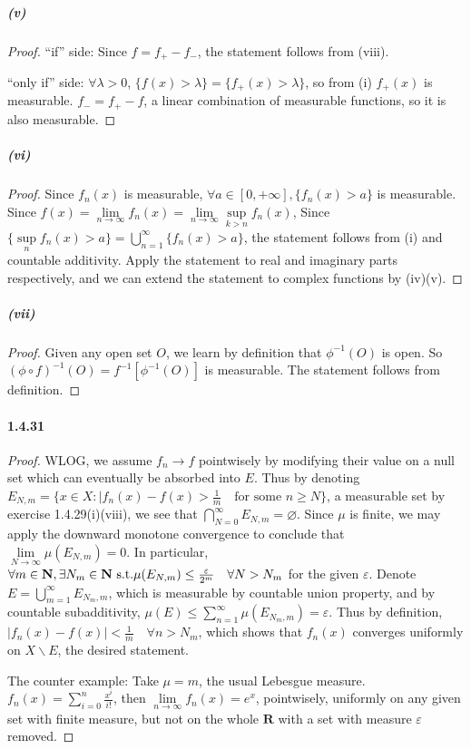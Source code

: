 \documentclass{article}
\begin{document}
\subparagraph{(v)}
\begin{proof}
``if'' side:  Since $f=f_+-f_-$, the statement follows from (viii).

``only if'' side: $\forall \lambda>0$, $\{f(x)>\lambda\}=\{f_+(x)>\lambda\}$, so from (i) $f_+(x)$ is measurable. $f_-=f_+-f$, a linear combination of measurable functions, so it is also measurable. 
\end{proof}

\subparagraph{(vi)}
\begin{proof}
Since $f_n(x)$ is measurable, $\forall a\in[0,+\infty],\{f_n(x)>a\}$ is measurable. Since $f(x)=\lim\limits_{n\to\infty}f_n(x)=\lim\limits_{n\to\infty}\sup\limits_{k>n}f_n(x)$, Since $\{\sup\limits_{n}f_n(x)>a\}=\bigcup\limits_{n=1}^{\infty}\{f_n(x)>a\}$, the statement follows from (i) and countable additivity. Apply the statement to real and imaginary parts respectively, and we can extend the statement to complex functions by (iv)(v).
\end{proof}

\subparagraph{(vii)}
\begin{proof}
Given any open set $O$, we learn by definition that $\phi^{-1}(O)$ is open. So $(\phi\circ f)^{-1}(O)=f^{-1}[\phi^{-1}(O)]$ is measurable. The statement follows from definition.
\end{proof}

\paragraph{1.4.31}
\begin{proof}
WLOG, we assume $f_n\to f$ pointwisely by modifying their value on a null set which can eventually be absorbed into $E$. Thus by denoting $E_{N,m}=\{x\in X:|f_n(x)-f(x)>\frac 1 m\quad \text{for some } n\geq N\}$, a measurable set by exercise 1.4.29(i)(viii), we see that $\bigcap\limits_{N=0}^{\infty}E_{N,m}=\varnothing$. Since $\mu$ is finite, we may apply the downward monotone convergence to conclude that $\lim\limits_{N\to\infty}\mu(E_{N,m})=0$. In particular, $\forall m\in\mathbf{N}, \exists N_m\in\mathbf{N}\text{ s.t.} \mu(E_{N,m})\leq \frac{\varepsilon}{2^m}\quad \forall N>N_m$ for the given $\varepsilon$. Denote $E=\bigcup\limits_{m=1}^{\infty}E_{N_m,m}$, which is measurable by countable union property, and by countable subadditivity, $\mu(E)\leq \sum\limits_{n=1}^{\infty}\mu(E_{N_m,m})=\varepsilon$. Thus by definition, $|f_n(x)-f(x)|<\frac 1 m\quad \forall n>N_m$, which shows that $f_n(x)$ converges uniformly on $X\backslash E$, the desired statement.

The counter example: Take $\mu=m$, the usual Lebesgue measure. $f_n(x)=\sum\limits_{i=0}^{n}\frac{x^i}{i!}$, then $\lim\limits_{n\to\infty}f_n(x)=e^x$, pointwisely, uniformly on any given set with finite measure, but not on the whole $\mathbf{R}$ with a set with measure $\varepsilon$ removed.
\end{proof}
\end{document}
